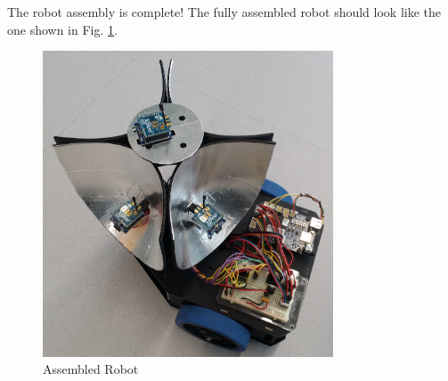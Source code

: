 The robot assembly is complete! The fully assembled robot should look like the one shown in Fig. \ref{fig:assembledRobot}.
\begin{figure}[H]
    \centering
    \includegraphics[width=3.4in]{figs/img/assembly/31-assembledRobot.jpg}
    \caption{Assembled Robot}
    \label{fig:assembledRobot}
\end{figure}

